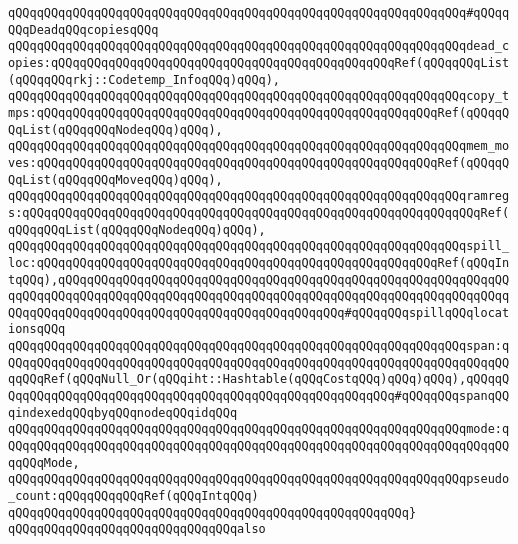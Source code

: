 \verb|qQQqqQQqqQQqqQQqqQQqqQQqqQQqqQQqqQQqqQQqqQQqqQQqqQQqqQQqqQQqqQQq#qQQqqQQqDeadqQQqcopiesqQQq|\newline
\verb|qQQqqQQqqQQqqQQqqQQqqQQqqQQqqQQqqQQqqQQqqQQqqQQqqQQqqQQqqQQqqQQqdead_copies:qQQqqQQqqQQqqQQqqQQqqQQqqQQqqQQqqQQqqQQqqQQqqQQqRef(qQQqqQQqList(qQQqqQQqrkj::Codetemp_InfoqQQq)qQQq),|\newline
\verb|qQQqqQQqqQQqqQQqqQQqqQQqqQQqqQQqqQQqqQQqqQQqqQQqqQQqqQQqqQQqqQQqcopy_tmps:qQQqqQQqqQQqqQQqqQQqqQQqqQQqqQQqqQQqqQQqqQQqqQQqqQQqqQQqRef(qQQqqQQqList(qQQqqQQqNodeqQQq)qQQq),|\newline
\verb|qQQqqQQqqQQqqQQqqQQqqQQqqQQqqQQqqQQqqQQqqQQqqQQqqQQqqQQqqQQqqQQqmem_moves:qQQqqQQqqQQqqQQqqQQqqQQqqQQqqQQqqQQqqQQqqQQqqQQqqQQqqQQqRef(qQQqqQQqList(qQQqqQQqMoveqQQq)qQQq),|\newline
\verb|qQQqqQQqqQQqqQQqqQQqqQQqqQQqqQQqqQQqqQQqqQQqqQQqqQQqqQQqqQQqqQQqramregs:qQQqqQQqqQQqqQQqqQQqqQQqqQQqqQQqqQQqqQQqqQQqqQQqqQQqqQQqqQQqqQQqRef(qQQqqQQqList(qQQqqQQqNodeqQQq)qQQq),|\newline
\newline
\verb|qQQqqQQqqQQqqQQqqQQqqQQqqQQqqQQqqQQqqQQqqQQqqQQqqQQqqQQqqQQqqQQqspill_loc:qQQqqQQqqQQqqQQqqQQqqQQqqQQqqQQqqQQqqQQqqQQqqQQqqQQqqQQqRef(qQQqIntqQQq),qQQqqQQqqQQqqQQqqQQqqQQqqQQqqQQqqQQqqQQqqQQqqQQqqQQqqQQqqQQqqQQqqQQqqQQqqQQqqQQqqQQqqQQqqQQqqQQqqQQqqQQqqQQqqQQqqQQqqQQqqQQqqQQqqQQqqQQqqQQqqQQqqQQqqQQqqQQqqQQqqQQqqQQqqQQqqQQqqQQq#qQQqqQQqspillqQQqlocationsqQQq|\newline
\newline
\verb|qQQqqQQqqQQqqQQqqQQqqQQqqQQqqQQqqQQqqQQqqQQqqQQqqQQqqQQqqQQqqQQqspan:qQQqqQQqqQQqqQQqqQQqqQQqqQQqqQQqqQQqqQQqqQQqqQQqqQQqqQQqqQQqqQQqqQQqqQQqqQQqRef(qQQqNull_Or(qQQqiht::Hashtable(qQQqCostqQQq)qQQq)qQQq),qQQqqQQqqQQqqQQqqQQqqQQqqQQqqQQqqQQqqQQqqQQqqQQqqQQqqQQqqQQq#qQQqqQQqspanqQQqindexedqQQqbyqQQqnodeqQQqidqQQq|\newline
\newline
\verb|qQQqqQQqqQQqqQQqqQQqqQQqqQQqqQQqqQQqqQQqqQQqqQQqqQQqqQQqqQQqqQQqmode:qQQqqQQqqQQqqQQqqQQqqQQqqQQqqQQqqQQqqQQqqQQqqQQqqQQqqQQqqQQqqQQqqQQqqQQqqQQqMode,|\newline
\newline
\verb|qQQqqQQqqQQqqQQqqQQqqQQqqQQqqQQqqQQqqQQqqQQqqQQqqQQqqQQqqQQqqQQqpseudo_count:qQQqqQQqqQQqRef(qQQqIntqQQq)|\newline
\verb|qQQqqQQqqQQqqQQqqQQqqQQqqQQqqQQqqQQqqQQqqQQqqQQqqQQqqQQq}|\newline
\newline
\verb|qQQqqQQqqQQqqQQqqQQqqQQqqQQqqQQqalso|\newline
